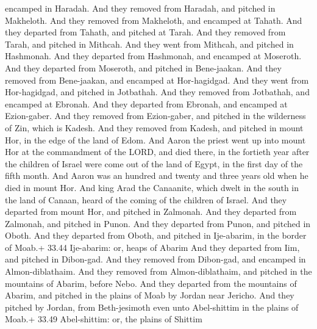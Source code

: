 encamped in Haradah.  And they removed from Haradah, and
pitched in Makheloth.  And they removed from Makheloth, and
encamped at Tahath.  And they departed from Tahath, and
pitched at Tarah.  And they removed from Tarah, and pitched
in Mithcah.  And they went from Mithcah, and pitched in
Hashmonah.  And they departed from Hashmonah, and encamped
at Moseroth.  And they departed from Moseroth, and pitched
in Bene-jaakan.  And they removed from Bene-jaakan, and
encamped at Hor-hagidgad.  And they went from Hor-hagidgad,
and pitched in Jotbathah.  And they removed from Jotbathah,
and encamped at Ebronah.  And they departed from Ebronah,
and encamped at Ezion-gaber.  And they removed from
Ezion-gaber, and pitched in the wilderness of Zin, which is Kadesh.
 And they removed from Kadesh, and pitched in mount Hor, in
the edge of the land of Edom.  And Aaron the priest went up
into mount Hor at the commandment of the LORD, and died there, in the
fortieth year after the children of Israel were come out of the land of
Egypt, in the first day of the fifth month.  And Aaron was
an hundred and twenty and three years old when he died in mount Hor.
 And king Arad the Canaanite, which dwelt in the south in
the land of Canaan, heard of the coming of the children of Israel.
 And they departed from mount Hor, and pitched in Zalmonah.
 And they departed from Zalmonah, and pitched in Punon.
 And they departed from Punon, and pitched in Oboth.
 And they departed from Oboth, and pitched in Ije-abarim,
in the border of Moab.+ 33.44 Ije-abarim: or, heaps of Abarim
 And they departed from Iim, and pitched in Dibon-gad.
 And they removed from Dibon-gad, and encamped in
Almon-diblathaim.  And they removed from Almon-diblathaim,
and pitched in the mountains of Abarim, before Nebo.  And
they departed from the mountains of Abarim, and pitched in the plains of
Moab by Jordan near Jericho.  And they pitched by Jordan,
from Beth-jesimoth even unto Abel-shittim in the plains of Moab.+ 33.49
Abel-shittim: or, the plains of Shittim

